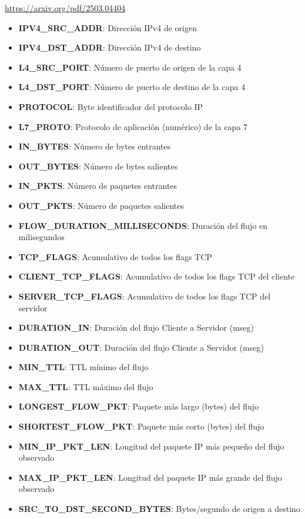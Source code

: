 \url{https://arxiv.org/pdf/2503.04404}

\begin{itemize}
    \item \textbf{IPV4\_SRC\_ADDR}: Dirección IPv4 de origen
    \item \textbf{IPV4\_DST\_ADDR}: Dirección IPv4 de destino
    \item \textbf{L4\_SRC\_PORT}: Número de puerto de origen de la capa 4
    \item \textbf{L4\_DST\_PORT}: Número de puerto de destino de la capa 4
    \item \textbf{PROTOCOL}: Byte identificador del protocolo IP
    \item \textbf{L7\_PROTO}: Protocolo de aplicación (numérico) de la capa 7
    \item \textbf{IN\_BYTES}: Número de bytes entrantes
    \item \textbf{OUT\_BYTES}: Número de bytes salientes
    \item \textbf{IN\_PKTS}: Número de paquetes entrantes
    \item \textbf{OUT\_PKTS}: Número de paquetes salientes
    \item \textbf{FLOW\_DURATION\_MILLISECONDS}: Duración del flujo en milisegundos
    \item \textbf{TCP\_FLAGS}: Acumulativo de todos los flags TCP
    \item \textbf{CLIENT\_TCP\_FLAGS}: Acumulativo de todos los flags TCP del cliente
    \item \textbf{SERVER\_TCP\_FLAGS}: Acumulativo de todos los flags TCP del servidor
    \item \textbf{DURATION\_IN}: Duración del flujo Cliente a Servidor (mseg)
    \item \textbf{DURATION\_OUT}: Duración del flujo Cliente a Servidor (mseg)
    \item \textbf{MIN\_TTL}: TTL mínimo del flujo
    \item \textbf{MAX\_TTL}: TTL máximo del flujo
    \item \textbf{LONGEST\_FLOW\_PKT}: Paquete más largo (bytes) del flujo
    \item \textbf{SHORTEST\_FLOW\_PKT}: Paquete más corto (bytes) del flujo
    \item \textbf{MIN\_IP\_PKT\_LEN}: Longitud del paquete IP más pequeño del flujo observado
    \item \textbf{MAX\_IP\_PKT\_LEN}: Longitud del paquete IP más grande del flujo observado
    \item \textbf{SRC\_TO\_DST\_SECOND\_BYTES}: Bytes/segundo de origen a destino

\end{itemize}
